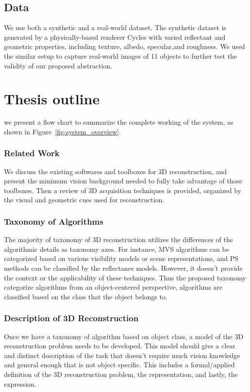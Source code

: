 \subsection{Data}
We use both a synthetic and a real-world dataset. The synthetic dataset is generated by a physically-based renderer Cycles with varied reflectant and geometric properties, including texture, albedo, specular,and roughness. We used the similar setup to capture real-world images of 11 objects to further test the validity of our proposed abstraction.

\section{Thesis outline}
we present a flow chart to summarize the complete working of the system, as shown in Figure~\ref{fig:system_overview}.

\subsubsection{Related Work}
We discuss the existing softwares and toolboxes for 3D reconstruction, and present the minimum vision background needed to fully take advantage of those toolboxes. Then a review of 3D acquisition techniques is provided, organized by the visual and geometric cues used for reconstruction.

\subsubsection{Taxonomy of Algorithms}
The majority of taxonomy of 3D reconstruction utilizes the differences of the algorithmic details as taxonomy axes. For instance, MVS algorithms can be categorized based on various visibility models or scene representations, and PS methods can be classified by the reflectance models. However, it doesn't provide the context or the applicability of these techniques. Thus the proposed taxonomy categorize algorithms from an object-centered perspective, \ie algorithms are classified based on the class that the object belongs to.

\subsubsection{Description of 3D Reconstruction}
Once we have a taxonomy of algorithm based on object class, a model of the 3D reconstruction problem needs to be developed. This model should give a clear and distinct description of the task that doesn't require much vision knowledge and general enough that is not object specific. This includes a formal/applied definition of the 3D reconstruction problem, the representation, and lastly, the expression.

